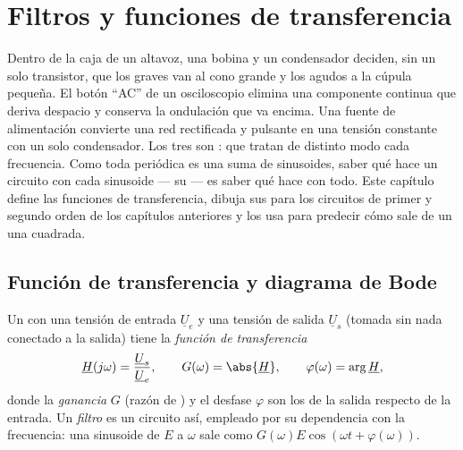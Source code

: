 \chapter{Filtros y funciones de transferencia}\label{ch:b1:filters-transfer-functions}

Dentro de la caja de un altavoz, una bobina y un condensador deciden, sin
un solo transistor, que los graves van al cono grande y los agudos a la
cúpula pequeña. El botón ``AC'' de un osciloscopio elimina una componente
continua que deriva despacio y conserva la ondulación que va encima. Una
fuente de alimentación convierte una red rectificada y pulsante en una
tensión constante con un solo condensador. Los tres son \emph{}:
 que tratan de distinto modo cada frecuencia. Como toda
 periódica es una suma de sinusoides, saber qué hace un circuito con
cada sinusoide --- su  --- es saber qué hace con
todo. Este capítulo define las funciones de transferencia, dibuja sus
 para los circuitos de primer y segundo orden de los
capítulos anteriores y los usa para predecir cómo sale de un  una
 cuadrada.

\section{Función de transferencia y diagrama de Bode}

\begin{definition}\label{def:b1:filters-transfer-functions:H}
Un  con una tensión de entrada $\underline U_e$ y una
tensión de salida $\underline U_s$ (tomada sin nada conectado a la salida)
tiene la \emph{función de transferencia}
\[
\underline H(j\omega) = \frac{\underline U_s}{\underline U_e},
\qquad G(\omega) = \abs{\underline H}, \qquad \varphi(\omega) = \arg\underline H,
\]
donde la \emph{ganancia} $G$ (razón de ) y el desfase $\varphi$
son los de la salida respecto de la entrada. Un \emph{filtro} es un
circuito así, empleado por su dependencia con la frecuencia: una sinusoide
de  $E$ a $\omega$ sale como $G(\omega)E\cos(\omega t + \varphi(\omega))$.
\end{definition}

